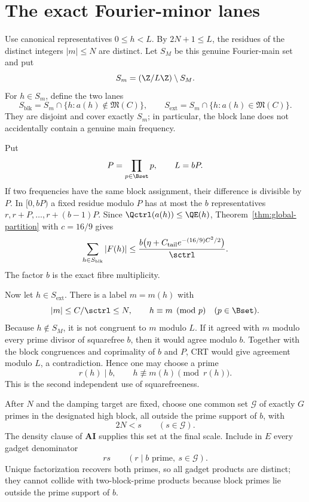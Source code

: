 \section{The exact Fourier-minor lanes}\label{sec:minor}

Use canonical representatives $0\le h<L$.  By $2N+1\le L$, the residues of
the distinct integers $|m|\le N$ are distinct.  Let $S_M$ be this genuine
Fourier-main set and put
\[
 S_m=(\Z/L\Z)\setminus S_M.
\]
For $h\in S_m$, define the two lanes
\begin{equation}\label{eq:minor-lanes}
 S_{\mathrm{blk}}
 =S_m\cap\{h:a(h)\notin\mathfrak M(C)\},
 \qquad
 S_{\mathrm{ext}}
 =S_m\cap\{h:a(h)\in\mathfrak M(C)\}.
\end{equation}
They are disjoint and cover exactly $S_m$; in particular, the block lane does
not accidentally contain a genuine main frequency.

Put
\[
 P=\prod_{p\in\Bset}p,
 \qquad L=bP.
\]
If two frequencies have the same block assignment, their difference is
divisible by $P$.  In $[0,bP)$ a fixed residue modulo $P$ has at most the $b$
representatives
$r,r+P,\ldots,r+(b-1)P$.  Since
$\Qctrl(a(h))\le\QE(h)$, Theorem~\ref{thm:global-partition} with $c=16/9$
gives
\begin{equation}\label{eq:block-minor-budget}
 \sum_{h\in S_{\mathrm{blk}}}|F(h)|
 \le
 \frac{b\bigl(\eta+C_{\mathrm{tail}}
 e^{-(16/9)C^2/2}\bigr)}{\sctrl}.
\end{equation}
The factor $b$ is the exact fibre multiplicity.

Now let $h\in S_{\mathrm{ext}}$.  There is a label $m=m(h)$ with
\[
 |m|\le C/\sctrl\le N,
 \qquad h\equiv m\pmod p\quad(p\in\Bset).
\]
Because $h\notin S_M$, it is not congruent to $m$ modulo $L$.  If it agreed
with $m$ modulo every prime divisor of squarefree $b$, then it would agree
modulo $b$.  Together with the block congruences and coprimality of $b$ and
$P$, CRT would give agreement modulo $L$, a contradiction.  Hence one may
choose a prime
\begin{equation}\label{eq:mismatch-prime}
 r(h)\mid b,
 \qquad h\not\equiv m(h)\pmod{r(h)}.
\end{equation}
This is the second independent use of squarefreeness.

After $N$ and the damping target are fixed, choose one common set $\mathcal G$
of exactly $G$ primes in the designated high block, all outside the prime
support of $b$, with
\begin{equation}\label{eq:high-prime-separation}
 2N<s\qquad(s\in\mathcal G).
\end{equation}
The density clause of $\mathbf{AI}$ supplies this set at the final scale.
Include in $E$ every gadget denominator
\begin{equation}\label{eq:gadget-family}
 rs\qquad(r\mid b\text{ prime},\ s\in\mathcal G).
\end{equation}
Unique factorization recovers both primes, so all gadget products are distinct;
they cannot collide with two-block-prime products because block primes lie
outside the prime support of $b$.

